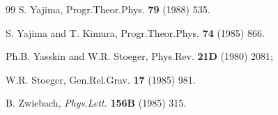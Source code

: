 \begin{thebibliography}{99}
 S. Yajima, Progr.Theor.Phys. {\bf 79} (1988) 535.

S. Yajima and T. Kimura, Progr.Theor.Phys. {\bf 74} (1985) 866.

Ph.B. Yasskin and W.R. Stoeger, Phys.Rev. {\bf 21D} (1980) 2081; 

W.R. Stoeger, Gen.Rel.Grav. {\bf 17} (1985) 981.  

B. Zwiebach, {\sl Phys.Lett.} {\bf 156B} (1985) 315.

\end{thebibliography}




